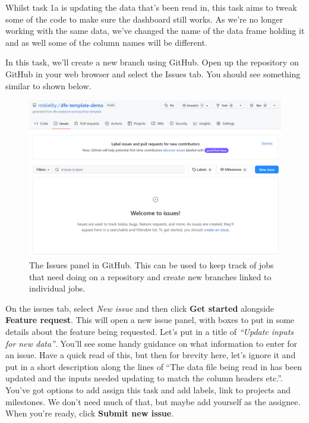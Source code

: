\documentclass[
  12pt,
]{article}
\begin{document}
Whilst task 1a is updating the data that's been read in, this task aims
to tweak some of the code to make sure the dashboard still works. As
we're no longer working with the same data, we've changed the name of
the data frame holding it and as well some of the column names will be
different.

In this task, we'll create a new branch using GitHub. Open up the
repository on GitHub in your web browser and select the Issues tab. You
should see something similar to shown below.

\begin{figure}

{\centering \includegraphics[width=0.92\linewidth]{images/gitdemo/gitdemo-GitHub-Issues} 

}

\caption{The Issues panel in GitHub. This can be used to keep track of jobs that need doing on a repository and create new branches linked to individual jobs.}\label{fig:unnamed-chunk-10}
\end{figure}

On the issues tab, select \emph{New issue} and then click \textbf{Get
started} alongside \textbf{Feature request}. This will open a new issue
panel, with boxes to put in some details about the feature being
requested. Let's put in a title of \emph{``Update inputs for new
data''}. You'll see some handy guidance on what information to enter for
an issue. Have a quick read of this, but then for brevity here, let's
ignore it and put in a short description along the lines of ``The data
file being read in has been updated and the inputs needed updating to
match the column headers etc.''. You've got options to add assign this
task and add labels, link to projects and milestones. We don't need much
of that, but maybe add yourself as the assignee. When you're ready,
click \textbf{Submit new issue}.
\end{document}
